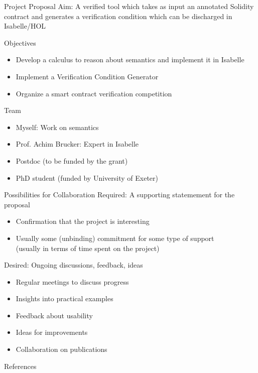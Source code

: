 \documentclass[aspectratio=169]{beamer}
\begin{document}
\begin{frame}{Project Proposal}
	Aim: A verified tool which takes as input an annotated Solidity contract and generates a verification condition which can be discharged in Isabelle/HOL
	\bigskip\pause

	Objectives
	\begin{itemize}
		\item Develop a calculus to reason about semantics and implement it in Isabelle
		\item Implement a Verification Condition Generator
		\item Organize a smart contract verification competition
	\end{itemize}
	\bigskip\pause

	Team
	\begin{itemize}
		\item Myself: Work on semantics
		\item Prof. Achim Brucker: Expert in Isabelle
		\item Postdoc (to be funded by the grant)
		\item PhD student (funded by University of Exeter)
	\end{itemize}
\end{frame}

\begin{frame}{Possibilities for Collaboration}
	Required: A supporting statemement for the proposal
	\begin{itemize}
		\item Confirmation that the project is interesting
		\item Usually some (unbinding) commitment for some type of support\\
		(usually in terms of time spent on the project)
	\end{itemize}
	\bigskip\pause

	Desired: Ongoing discussions, feedback, ideas
	\begin{itemize}
		\item Regular meetings to discuss progress
		\item Insights into practical examples
		\item Feedback about usability
		\item Ideas for improvements
		\item Collaboration on publications
	\end{itemize}
\end{frame}

\begin{frame}[allowframebreaks]{References}
	\nocite{*}
	
	
\end{frame}
\end{document}
